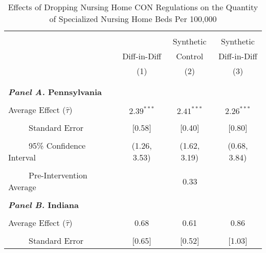 \documentclass[../Main.tex]{subfiles}
\begin{document}
\newpage
\null
\vfill
\begin{table}[htbp]\centering \footnotesize
\def\sym#1{\ifmmode^{#1}\else\(^{#1}\)\fi}
\captionsetup{width=.75\textwidth}
\caption{\centering Effects of Dropping Nursing Home CON Regulations on the Quantity of Specialized Nursing Home Beds Per 100,000}
\label{tab:ave_results_q_specbeds_nobord_nocov}
\setlength{\tabcolsep}{10pt}
\begin{tabular}{l*{3}{c}}
\hline\hline
\\[-2ex]
&\multicolumn{1}{c}{}&\multicolumn{1}{c}{Synthetic}&\multicolumn{1}{c}{Synthetic}\\
&\multicolumn{1}{c}{Diff-in-Diff}&\multicolumn{1}{c}{Control}&\multicolumn{1}{c}{Diff-in-Diff}\\
&\multicolumn{1}{c}{(1)}&\multicolumn{1}{c}{(2)}&\multicolumn{1}{c}{(3)}\\
\\[-2ex]
\hline
\\[-.1ex]
\multicolumn{4}{l}{\textbf{\textit{Panel A.} Pennsylvania}}\\
\\[-1.5ex]
\multicolumn{1}{l}{Average Effect ($\hat{\tau}$)}&   \multicolumn{1}{c}{$2.39^{***}$}&   \multicolumn{1}{c}{$2.41^{***}$}&  \multicolumn{1}{c}{$2.26^{***}$}\\
\\[-2ex]
\multicolumn{1}{l}{\ \ \ \ \ Standard Error}  &\multicolumn{1}{c}{[0.58]}&\multicolumn{1}{c}{[0.40]}&\multicolumn{1}{c}{[0.80]}\\
\\[-2ex]
\multicolumn{1}{l}{\ \ \ \ \ 95\% Confidence Interval}&   \multicolumn{1}{c}{(1.26, 3.53)}&   \multicolumn{1}{c}{(1.62, 3.19)}&   \multicolumn{1}{c}{(0.68, 3.84)}\\
\\[-2ex]
\multicolumn{1}{l}{\ \ \ \ \ Pre-Intervention Average}&   \multicolumn{3}{c}{0.33}\\
\\[-.1ex]
\multicolumn{4}{l}{\textbf{\textit{Panel B.} Indiana}}\\
\\[-1.5ex]
\multicolumn{1}{l}{Average Effect ($\hat{\tau}$)}&   \multicolumn{1}{c}{0.68}&   \multicolumn{1}{c}{0.61} &  \multicolumn{1}{c}{0.86}\\
\\[-2ex]
\multicolumn{1}{l}{\ \ \ \ \ Standard Error}  &\multicolumn{1}{c}{[0.65]}&\multicolumn{1}{c}{[0.52]}&\multicolumn{1}{c}{[1.03]}\\

\end{tabular}
\end{table}
\end{document}
